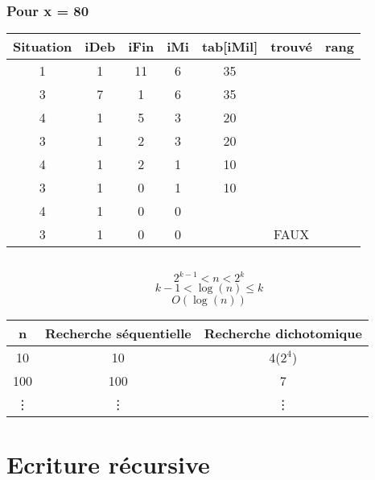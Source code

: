 \documentclass{article}
\begin{document}
			\subsubsection{Pour x = 80}
			\begin{tabular}{|c|c|c|c|c|c|c|}
				\hline
					\textbf{Situation} & \textbf{iDeb} & \textbf{iFin} & \textbf{iMi} & \textbf{tab[iMil]} & \textbf{trouvé} & \textbf{rang}\\
				\hline
					1 & 1 & 11 & 6 & 35 & &\\
				\hline
					3 & 7 & 1 & 6 & 35 & &\\ 
				\hline
					4 & 1 & 5 & 3 & 20 & &\\ 
				\hline
					3 & 1 & 2 & 3 & 20 & &\\ 
				\hline
					4 & 1 & 2 & 1 & 10 & &\\ 
				\hline
					3 & 1 & 0 & 1 & 10 & &\\ 
				\hline
					4 & 1 & 0 & 0 & & &\\ 
				\hline
					3 & 1 & 0 & 0 & & FAUX &\\ 
				\hline
			\end{tabular}
		\subsection{}
			$$2^{k-1} < n < 2^{k}$$
			$$k-1 < \log(n) \leq k$$
			$$O(\log(n))$$
			\begin{tabular}{c|c|c}
					\textbf{n} & \textbf{Recherche séquentielle} & \textbf{Recherche dichotomique}\\
				\hline
					10 & 10 & 4($2^{4}$)\\
				\hline
					100 & 100 & 7 \\
				\hline
					\vdots & \vdots & \vdots\\
			\end{tabular}	
		\subsection{}
			
	\section{Ecriture récursive}	
		
\end{document}
